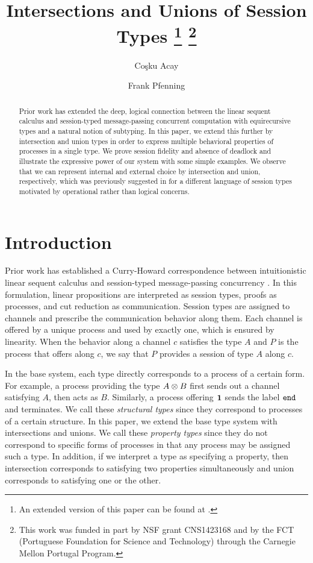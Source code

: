 \documentclass[submission,copyright,creativecommons]{eptcs}
\title{Intersections and Unions of Session Types%
\footnote{An extended version of this paper can be found at \cite{Acay16}.}%
\footnote{This work was funded in part by NSF grant CNS1423168 and by the FCT (Portuguese Foundation for Science and Technology) through the Carnegie Mellon Portugal Program.}%
}
\author{Co\c{s}ku Acay
\institute{Carnegie Mellon University\\
Pennsylvania, USA}
\email{cacay@cmu.edu}
\and
Frank Pfenning
\institute{Carnegie Mellon University \\
Pennsylvania, USA}
\email{fp@cs.cmu.edu}
}
\begin{document}
\maketitle

\begin{abstract}
  Prior work has extended the deep, logical connection between the linear sequent calculus and session-typed message-passing concurrent computation with equirecursive types and a natural notion of subtyping. In this paper, we extend this further by intersection and union types in order to express multiple behavioral properties of processes in a single type. We prove session fidelity and absence of deadlock and illustrate the expressive power of our system with some simple examples. We observe that we can represent internal and external choice by intersection and union, respectively, which was previously suggested in \cite{CastagnaDGP09,Padovani10} for a different language of session types motivated by operational rather than logical concerns.
\end{abstract}


\section{Introduction}

Prior work has established a Curry-Howard correspondence between intuitionistic linear sequent calculus and session-typed message-passing concurrency \cite{CairesP10, PfenningG15, Honda93}. In this formulation, linear propositions are interpreted as session types, proofs as processes, and cut reduction as communication. Session types are assigned to channels and prescribe the communication behavior along them. Each channel is offered by a unique process and used by exactly one, which is ensured by linearity. When the behavior along a channel $c$ satisfies the type $A$ and $P$ is the process that offers along $c$, we say that $P$ provides a session of type $A$ along $c$.

In the base system, each type directly corresponds to a process of a certain form. For example, a process providing the type $A \otimes B$ first sends out a channel satisfying $A$, then acts as $B$. Similarly, a process offering $\mathbf{1}$ sends the label $\texttt{end}$ and terminates. We call these \emph{structural types} since they correspond to processes of a certain structure. In this paper, we extend the base type system with intersections and unions. We call these \emph{property types} since they do not correspond to specific forms of processes in that any process may be assigned such a type. In addition, if we interpret a type as specifying a property, then intersection corresponds to satisfying two properties simultaneously and union corresponds to satisfying one or the other.
\end{document}
